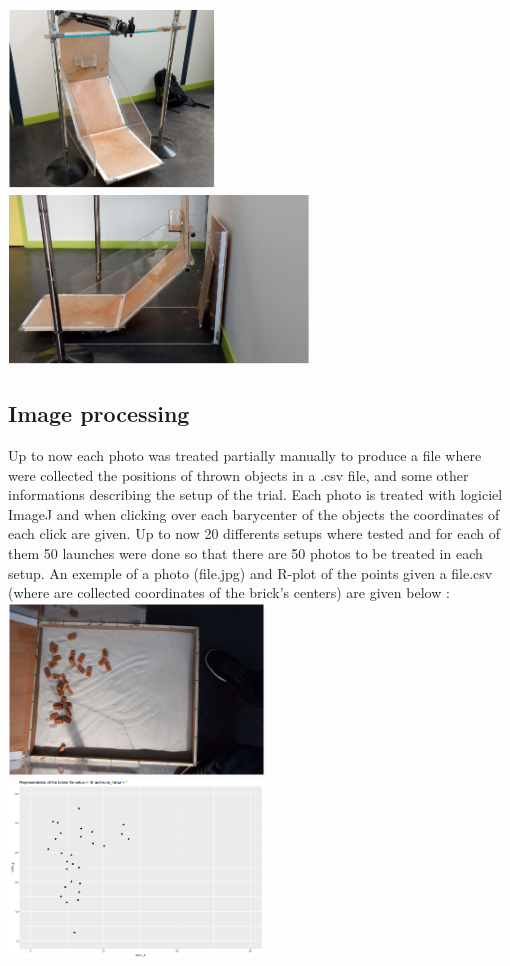 \documentclass{article}
\begin{document}
\includegraphics[width=5.5cm]{images/img1.png} 
\includegraphics[width=8cm]{images/img2.png} 


\subsection{Image processing}

Up to now each photo was treated partially manually to produce a file where were collected the positions of thrown objects in a .csv file, and some other informations describing
the setup of the trial.
Each photo is treated with logiciel ImageJ and when clicking over each barycenter of
the objects the coordinates of each click are given. Up to now 20 differents setups where
tested and for each of them 50 launches were done so that there are 50 photos to be
treated in each setup. An exemple of a photo (file.jpg) and R-plot of the points given a
file.csv (where are collected coordinates of the brick’s centers) are given below :\\

\includegraphics[width=6.8cm]{images/img3.png} 
\includegraphics[width=6.8cm]{images/img4.png} 
\end{document}
